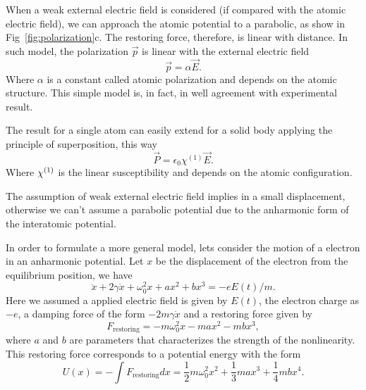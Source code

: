 When a weak external electric field is considered (if compared with the atomic electric field), we can approach the atomic potential to a parabolic, as show in Fig~\ref{fig:polarization}c. The restoring force, therefore, is linear with distance. In such model, the polarization $\vec{p}$ is linear with the external electric field
\begin{equation}
    \vec{p} = \alpha \vec{E}.
\end{equation}
Where $\alpha$ is a constant called atomic polarization and depends on the atomic structure. This simple model is, in fact, in well agreement with experimental result.  

The result for a single atom can easily extend for a solid body applying the principle of  superposition, this way
\begin{equation}
    \vec{P} = \epsilon_0\chi^{(1)}\vec{E}.
\end{equation}
Where $\chi^{( 1)}$ is the linear susceptibility and depends on the atomic configuration.

The assumption of weak external electric field implies in a small displacement, otherwise we can't assume a parabolic potential due to the anharmonic form of the interatomic potential. 

In order to formulate a more general model, lets consider the motion of a electron in an anharmonic potential. Let $x$ be the displacement of the electron from the equilibrium position, we have
\begin{equation}
    \ddot{x} + 2\gamma\dot{x} + \omega_0^2x+ax^2+bx^3 = -eE(t)/m.
    \label{eq:motion_equation_electron}
\end{equation}
Here we assumed a applied electric field is given by $E(t)$, the electron charge as $-e$, a damping force of the form $-2m\gamma\dot{x}$ and a restoring force given by
\begin{equation}
    F_\text{restoring} = -m\omega_0^2x -max^2 -mbx^3, 
\end{equation}
where $a$ and $b$ are parameters that characterizes the strength of the nonlinearity. This restoring force corresponds to a potential energy with the form 
\begin{equation}
    U(x) = -\int F_\text{restoring} dx = \frac{1}{2}m\omega_0^2x^2 +\frac{1}{3}max^3 +\frac{1}{4}mbx^4.
\end{equation}

